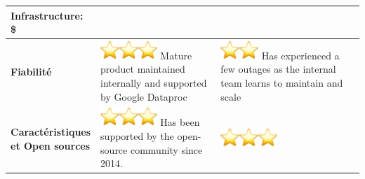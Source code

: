 \begin{longtable}{|p{0.23\linewidth}|p{0.35\linewidth}|p{0.42\linewidth}|}
Infrastructure: \textcolor[RGB]{0, 128, 0}{\textbf{\large \$}} \\ \hline
\textbf{Fiabilité} & 
\includegraphics[width=0.28in,height=0.28in]{images/image3.png}\includegraphics[width=0.28in,height=0.28in]{images/image3.png}\includegraphics[width=0.28in,height=0.28in]{images/image3.png}\newline
Mature product maintained internally and supported by Google Dataproc &
\includegraphics[width=0.28in,height=0.28in]{images/image3.png}\includegraphics[width=0.28in,height=0.28in]{images/image3.png}\newline
Has experienced a few outages as the internal team learns to maintain and scale \\ \hline
\textbf{Caractéristiques et Open sources} & 
\includegraphics[width=0.28in,height=0.28in]{images/image3.png}\includegraphics[width=0.28in,height=0.28in]{images/image3.png}\includegraphics[width=0.28in,height=0.28in]{images/image3.png}\newline
Has been supported by the open-source community since 2014. &
\includegraphics[width=0.28in,height=0.28in]{images/image3.png}\includegraphics[width=0.28in,height=0.28in]{images/image3.png}\includegraphics[width=0.28in,height=0.28in]{images/image3.png}\newline

\end{longtable}
